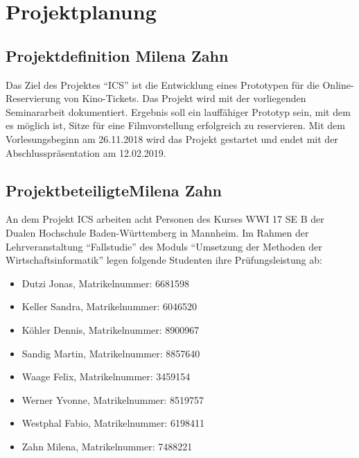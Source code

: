 \chapter{Projektplanung}
	
	\section[Projektdefinition]{Projektdefinition {\hfill \normalsize Milena Zahn}}
	Das Ziel des Projektes \enquote{\ac{ICS}} ist die Entwicklung eines Prototypen für die Online-Reservierung von Kino-Tickets. Das Projekt wird mit der vorliegenden Seminararbeit dokumentiert. Ergebnis soll ein lauffähiger Prototyp sein, mit dem es möglich ist, Sitze für eine Filmvorstellung erfolgreich zu reservieren. Mit dem Vorlesungsbeginn am 26.11.2018 wird das Projekt gestartet und endet mit der Abschlusspräsentation am 12.02.2019.
	
	\section[Projektbeteiligte]{Projektbeteiligte{\hfill \normalsize Milena Zahn}}
	An dem Projekt \ac{ICS} arbeiten acht Personen des Kurses WWI 17 SE B der Dualen Hochschule Baden-Württemberg in Mannheim. Im Rahmen der Lehrveranstaltung \enquote{Fallstudie} des Moduls \enquote{Umsetzung der Methoden der Wirtschaftsinformatik} legen folgende Studenten ihre Prüfungsleistung ab:
	\begin{singlespacing}
	\begin{itemize}
		\item Dutzi Jonas, Matrikelnummer: 6681598
		\item Keller Sandra, Matrikelnummer: 6046520 
		\item Köhler Dennis, Matrikelnummer: 8900967 
		\item Sandig Martin, Matrikelnummer: 8857640 
		\item Waage Felix, Matrikelnummer: 3459154 
		\item Werner Yvonne, Matrikelnummer: 8519757 
		\item Westphal Fabio, Matrikelnummer: 6198411  
		\item Zahn Milena, Matrikelnummer: 7488221 
	\end{itemize}
	\end{singlespacing}

